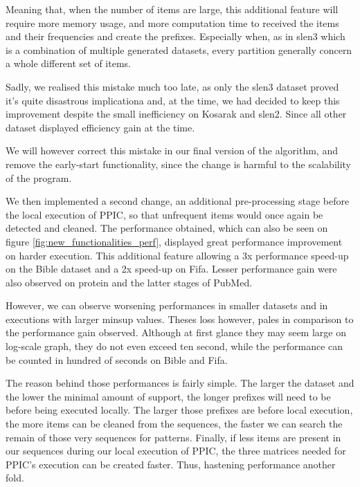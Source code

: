 \documentclass{eplmastersthesis}
\begin{document}
Meaning that, when the number of items are large, this additional feature will require more memory usage, and more computation time to received the items and their frequencies and create the prefixes. Especially when, as in slen3 which is a combination of multiple generated datasets, every partition generally concern a whole different set of items.\newline

Sadly, we realised this mistake much too late, as only the slen3 dataset proved it's quite disastrous implicationa and, at the time, we had decided to keep this improvement despite the small inefficiency on Kosarak and slen2. Since all other dataset displayed efficiency gain at the time. \newline

We will however correct this mistake in our final version of the algorithm, and remove the early-start functionality, since the change is harmful to the scalability of the program. \newline

We then implemented a second change, an additional pre-processing stage before the local execution of PPIC, so that unfrequent items would once again be detected and cleaned. The performance obtained, which can also be seen on figure \ref{fig:new_functionalities_perf}, displayed great performance improvement on harder execution. This additional feature allowing a 3x performance speed-up on the Bible dataset and a 2x speed-up on Fifa. Lesser performance gain were also observed on protein and the latter stages of PubMed. \newline

However, we can observe worsening performances in smaller datasets and in executions with larger minsup values. Theses loss however, pales in comparison to the performance gain observed. Although at first glance they may seem large on log-scale graph, they do not even exceed ten second, while the performance can be counted in hundred of seconds on Bible and Fifa. \newline

The reason behind those performances is fairly simple. The larger the dataset and the lower the minimal amount of support, the longer prefixes will need to be before being executed locally. The larger those prefixes are before local execution, the more items can be cleaned from the sequences, the faster we can search the remain of those very sequences for patterns. Finally, if less items are present in our sequences during our local execution of PPIC, the three matrices needed for PPIC's execution can be created faster. Thus, hastening performance another fold. \newline
\end{document}
